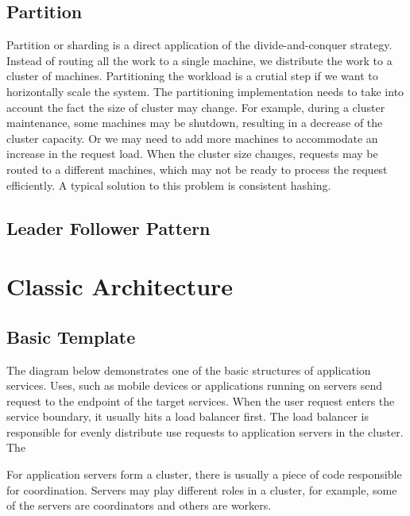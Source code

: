 \documentclass[letterpaper, oneside]{book}
\begin{document}
\section{Partition}
Partition or sharding is a direct application of the divide-and-conquer strategy. Instead of routing all the work to a single machine, we distribute the work to a cluster of machines. Partitioning the workload is a crutial step if we want to horizontally scale the system. The partitioning implementation needs to take into account the fact the size of cluster may change.
For example, during a cluster maintenance, some machines may be shutdown, resulting in a decrease of the cluster capacity. Or we may need to add more machines to accommodate an increase in the request load. When the cluster size changes, requests may be routed to a different machines, which may not be ready to process the request efficiently. A typical solution to this problem is consistent hashing.


\section{Leader Follower Pattern}




\chapter{Classic Architecture}

\section{Basic Template}

The diagram below demonstrates one of the basic structures of application services. Uses, such as mobile devices or applications running on servers send request to the endpoint of the target services. When the user request enters the service boundary, it usually hits a load balancer first. The load balancer is responsible for evenly distribute use requests to application servers in the cluster. The

For application servers form a cluster, there is usually a piece of code responsible for coordination. Servers may play different roles in a cluster, for example, some of the servers are coordinators and others are workers.
\end{document}
